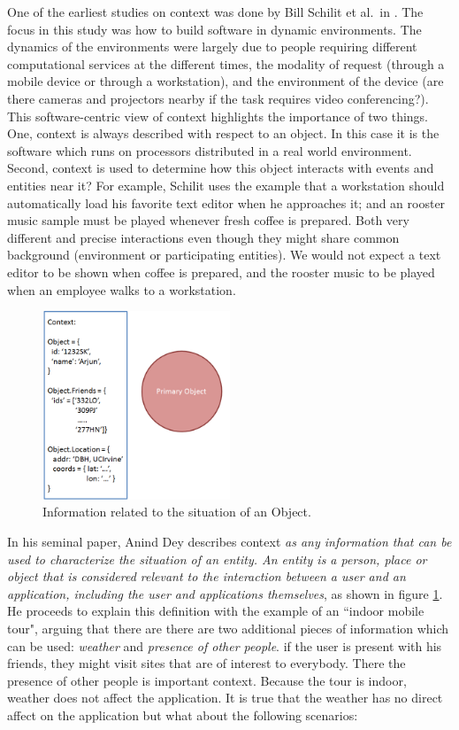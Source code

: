 One of the earliest studies on context was done by Bill Schilit et al.\ in \cite{schilit1994context}. The focus in this study was how to build software in dynamic environments. The dynamics of the environments were largely due to people requiring different computational services at the different times, the modality of request (through a mobile device or through a workstation), and the environment of the device (are there cameras and projectors nearby if the task requires video conferencing?). This software-centric view of context highlights the importance of two things. One, context is always described with respect to an object. In this case it is the software which runs on processors distributed in a real world environment. Second, context is used to determine how this object interacts with events and entities near it? For example, Schilit uses the example that a workstation should automatically load his favorite text editor when he approaches it; and an rooster music sample must be played whenever fresh coffee is prepared. Both very different and precise interactions even though they might share common background (environment or participating entities). We would not expect a text editor to be shown when coffee is prepared, and the rooster music to be played when an employee walks to a workstation.

\begin{figure}[t]
\centering
\includegraphics[width=0.5\textwidth]{media/chapter2/dey-def.png}
\caption{Information related to the situation of an Object.}
\label{fig:anind-def}
\end{figure}

In his seminal paper, Anind Dey \cite{dey2001understanding} describes context \textit{as any information that can be used to characterize the situation of an entity. An entity is a person, place or object that is considered relevant to the interaction between a user and an application, including the user and applications themselves}, as shown in figure \ref{fig:anind-def}. He proceeds to explain this definition with the example of an ``indoor mobile tour", arguing that there are there are two additional pieces of information which can be used: \textit{weather} and \textit{presence of other people}. if the user is present with his friends, they might visit sites that are of interest to everybody. There the presence of other people is important context. Because the tour is indoor, weather does not affect the application. It is true that the weather has no direct affect on the application but what about the following scenarios:

